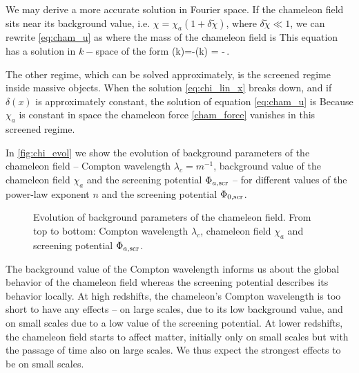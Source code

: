 We may derive a more accurate solution in Fourier space. If the chameleon field sits near its background value, i.e. $\chi=\chi_a\left(1 + \delta\tilde\chi \right)$, where $\delta\tilde\chi \ll 1$, we can rewrite \eqref{eq:cham_u} as
where the mass of the chameleon field is
This equation has a solution in $k-$space of the form
\eq
{
\label{eq:chi_lin_k}
	\hat{\chi}(k)=-\hat{\delta}(k) = -\frac{\beta\bar\rho}{\Mpl}\,.
}

The other regime, which can be solved approximately, is the screened regime inside massive objects. When the solution \eqref{eq:chi_lin_x} breaks down, and if $\delta(x)$ is approximately constant, the solution of equation \eqref{eq:cham_u} is
Because $\chi_a$ is constant in space the chameleon force \eqref{cham_force} vanishes in this screened regime.

In \autoref{fig:chi_evol} we show the evolution of background parameters of the chameleon field -- Compton wavelength $\lambda_c=m^{-1}$, background value of the chameleon field $\chi_a$ and the screening potential $\Phi_{a,\text{\scriptsize scr}}$ -- for different values of the power-law exponent $n$ and the screening potential $\Phi_{0,\text{\scriptsize scr}}$.

\begin{figure}[hbt]
\centering
	\begin{subfigure}{1.0\textwidth}
	\end{subfigure}
	\begin{subfigure}{1.0\textwidth}
	\end{subfigure}
    \caption{Evolution of background parameters of the chameleon field. From top to bottom: Compton wavelength $\lambda_c$, chameleon field $\chi_a$ and screening potential $\Phi_{a,\text{\scriptsize scr}}$.}
    \label{fig:chi_evol}
\end{figure}

The background value of the Compton wavelength informs us about the global behavior of the chameleon field whereas the screening potential describes its behavior locally. At high redshifts, the chameleon's Compton wavelength is too short to have any effects -- on large scales, due to its low background value, and on small scales due to a low value of the screening potential. At lower redshifts, the chameleon field starts to affect matter, initially only on small scales but with the passage of time also on large scales. We thus expect the strongest effects to be on small scales.
